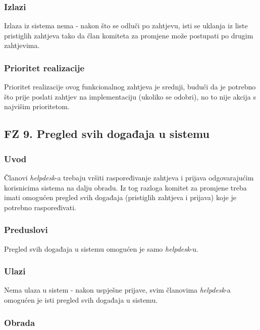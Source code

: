 \documentclass[12pt,a4paper]{article}
\begin{document}
\subsubsection{Izlazi}

Izlaza iz sistema nema - nakon što se odluči po zahtjevu, isti se uklanja iz liste pristiglih zahtjeva tako da član komiteta za promjene može postupati po drugim zahtjevima.

\subsubsection{Prioritet realizacije}

Prioritet realizacije ovog funkcionalnog zahtjeva je srednji, budući da je potrebno što prije poslati zahtjev na implementaciju (ukoliko se odobri), no to nije akcija s najvišim prioritetom.

\subsection{FZ 9. Pregled svih događaja u sistemu}

\subsubsection{Uvod}

Članovi \textit{helpdesk}-a trebaju vršiti raspoređivanje zahtjeva i prijava odgovarajućim korisnicima sistema na dalju obradu. Iz tog razloga komitet za promjene treba imati omogućen pregled svih događaja (pristiglih zahtjeva i prijava) koje je potrebno raspoređivati.

\subsubsection{Preduslovi}

Pregled svih događaja u sistemu omogućen je samo \textit{helpdesk}-u.

\subsubsection{Ulazi}

Nema ulaza u sistem - nakon uspješne prijave, svim članovima \textit{helpdesk}-a omogućen je isti pregled svih događaja u sistemu.

\subsubsection{Obrada}
\end{document}
